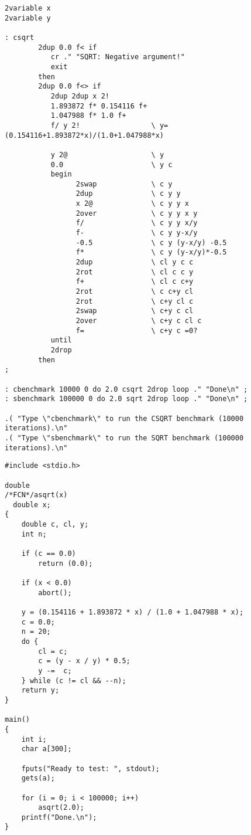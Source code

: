 \centerline{}

\begin{verbatim}
2variable x
2variable y

: csqrt
        2dup 0.0 f< if
           cr ." "SQRT: Negative argument!"
           exit
        then
        2dup 0.0 f<> if
           2dup 2dup x 2!
           1.893872 f* 0.154116 f+
           1.047988 f* 1.0 f+
           f/ y 2!                 \ y=(0.154116+1.893872*x)/(1.0+1.047988*x)

           y 2@                    \ y
           0.0                     \ y c
           begin
                 2swap             \ c y
                 2dup              \ c y y
                 x 2@              \ c y y x
                 2over             \ c y y x y
                 f/                \ c y y x/y
                 f-                \ c y y-x/y
                 -0.5              \ c y (y-x/y) -0.5
                 f*                \ c y (y-x/y)*-0.5
                 2dup              \ cl y c c
                 2rot              \ cl c c y
                 f+                \ cl c c+y
                 2rot              \ c c+y cl
                 2rot              \ c+y cl c
                 2swap             \ c+y c cl
                 2over             \ c+y c cl c
                 f=                \ c+y c =0?
           until
           2drop
        then
;

: cbenchmark 10000 0 do 2.0 csqrt 2drop loop ." "Done\n" ;
: sbenchmark 100000 0 do 2.0 sqrt 2drop loop ." "Done\n" ;

.( "Type \"cbenchmark\" to run the CSQRT benchmark (10000 iterations).\n"
.( "Type \"sbenchmark\" to run the SQRT benchmark (100000 iterations).\n"
\end{verbatim}
\clearpage
\centerline{}

\begin{verbatim}
#include <stdio.h>

double
/*FCN*/asqrt(x)
  double x;
{
    double c, cl, y;
    int n;

    if (c == 0.0)
        return (0.0);

    if (x < 0.0)
        abort();

    y = (0.154116 + 1.893872 * x) / (1.0 + 1.047988 * x);
    c = 0.0;
    n = 20;
    do {
        cl = c;
        c = (y - x / y) * 0.5;
        y -=  c;
    } while (c != cl && --n);
    return y;
}

main()
{
    int i;
    char a[300];

    fputs("Ready to test: ", stdout);
    gets(a);

    for (i = 0; i < 100000; i++)
        asqrt(2.0);
    printf("Done.\n");
}
\end{verbatim}
\clearpage
\centerline{}

